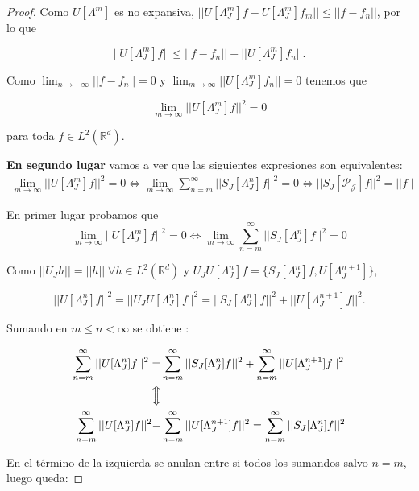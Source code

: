 \begin{proof}
  \medskip

  \noindent Como $U[\Lambda^m]$ es no expansiva, $||U[\Lambda_J^m]f-U[\Lambda_J^m]f_m|| \leq ||f - f_n||$, por lo que 

  $$||U[\Lambda_J^m]f|| \leq || f-f_n|| + ||U[\Lambda_J^m]f_n||.$$

  \noindent Como $\lim_{n\rightarrow -\infty}||f-f_n||=0$ y $\lim_{m\rightarrow\infty}||U[\Lambda_J^m]f_n||=0$ tenemos que 

  $$\lim_{m\rightarrow\infty} ||U[\Lambda_J^m]f||^2=0$$

  \noindent para toda $f \in L^2(\mathbb{R}^d)$. 

  \medskip

  \noindent \textbf{En segundo lugar} vamos a ver que las siguientes expresiones son equivalentes: 
  \begin{align*}
    \lim_{m\rightarrow \infty} ||U[\Lambda_J^m]f||^2=0 \iff \lim_{m\rightarrow\infty} \sum_{n=m}^{\infty} ||S_J[\Lambda_J^n]f||^2=0 \iff ||S_J[\mathcal{P_J}]f||^2 = ||f||
  \end{align*}

  En primer lugar probamos que 
  $$\lim_{m\rightarrow \infty} ||U[\Lambda_J^m]f||^2=0 \iff \lim_{m\rightarrow\infty} \sum_{n=m}^{\infty} ||S_J[\Lambda_J^n]f||^2=0$$
  
  \noindent Como $||U_J h||=||h|| \; \forall h \in L^2(\mathbb{R}^d)$ y $U_J U[\Lambda_J^n]f=\lbrace S_J[\Lambda_J^n]f,U[\Lambda_J^{n+1}]\rbrace$,

 \begin{equation} \label{eq::1.8}
  ||U[\Lambda_J^n]f||^2=||U_JU[\Lambda_J^n]f||^2=||S_J[\Lambda_J^n]f||^2+||U[\Lambda_J^{n+1}]f||^2. 
 \end{equation}

  \noindent Sumando en $m\leq n < \infty$ se obtiene : 
  
  \begin{align*}
    \sum_{n=m}^\infty ||U[\Lambda_J^n]f||^2=&\sum_{n=m}^\infty ||S_J[\Lambda_J^n]f||^2 + \sum_{n=m}^\infty||U[\Lambda_J^{n+1}]f||^2 \\
    \Big\Updownarrow \\
    \sum_{n=m}^\infty ||U[\Lambda_J^n]f||^2 -& \sum_{n=m}^\infty||U[\Lambda_J^{n+1}]f||^2 =\sum_{n=m}^\infty ||S_J[\Lambda_J^n]f||^2  \\
  \end{align*}
  
  \noindent En el término de la izquierda se anulan entre si todos los sumandos salvo $n=m$, luego queda: 


\end{proof}
